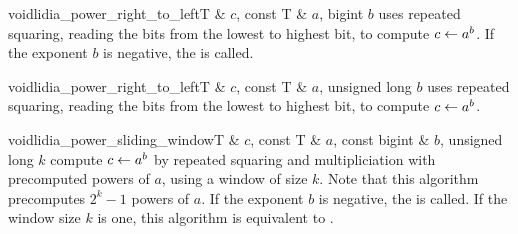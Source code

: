 \begin{fcode}{void}{lidia_power_right_to_left}{T & $c$, const T & $a$, bigint $b$}
  uses repeated squaring, reading the bits from the lowest to highest bit, to compute $c \leftarrow
  a^b$.  If the exponent $b$ is negative, the \LEH is called.
\end{fcode}

\begin{fcode}{void}{lidia_power_right_to_left}{T & $c$, const T & $a$, unsigned long $b$}
  uses repeated squaring, reading the bits from the lowest to highest bit, to compute $c \leftarrow
  a^b$.
\end{fcode}

\begin{fcode}{void}{lidia_power_sliding_window}{T & $c$, const T & $a$, const bigint & $b$, unsigned long $k$}
  compute $c \leftarrow a^b$ by repeated squaring and multipliciation with precomputed powers of
  $a$, using a window of size $k$.  Note that this algorithm precomputes $2^k-1$ powers of $a$.
  If the exponent $b$ is negative, the \LEH is called.  If the window size $k$ is one, this
  algorithm is equivalent to .

\end{fcode}



\SEEALSO




\EXAMPLES

